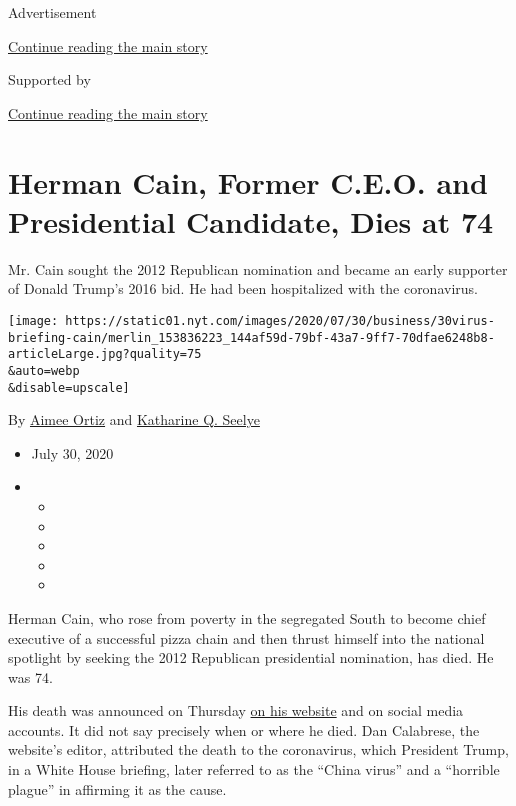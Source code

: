 Advertisement

\protect\hyperlink{after-top}{Continue reading the main story}

Supported by

\protect\hyperlink{after-sponsor}{Continue reading the main story}

\hypertarget{herman-cain-former-ceo-and-presidential-candidate-dies-at-74}{%
\section{Herman Cain, Former C.E.O. and Presidential Candidate, Dies at
74}\label{herman-cain-former-ceo-and-presidential-candidate-dies-at-74}}

Mr. Cain sought the 2012 Republican nomination and became an early
supporter of Donald Trump's 2016 bid. He had been hospitalized with the
coronavirus.

\texttt{[image: https://static01.nyt.com/images/2020/07/30/business/30virus-briefing-cain/merlin\_153836223\_144af59d-79bf-43a7-9ff7-70dfae6248b8-articleLarge.jpg?quality=75\\\&auto=webp\\\&disable=upscale]}

By \href{https://www.nytimes.com/by/aimee-ortiz}{Aimee Ortiz} and
\href{https://www.nytimes.com/by/katharine-q-seelye}{Katharine Q.
Seelye}

\begin{itemize}
\item
  July 30, 2020
\item
  \begin{itemize}
  \item
  \item
  \item
  \item
  \item
  \end{itemize}
\end{itemize}

Herman Cain, who rose from poverty in the segregated South to become
chief executive of a successful pizza chain and then thrust himself into
the national spotlight by seeking the 2012 Republican presidential
nomination, has died. He was 74.

His death was announced on Thursday
\href{https://hermancain.com/heartbroken-world-poorer-herman-cain-gone-lord/?utm_source=twitter\&utm_medium=thenewvoice\&utm_content=2020-07-30}{on
his website} and on social media accounts. It did not say precisely when
or where he died. Dan Calabrese, the website's editor, attributed the
death to the coronavirus, which President Trump, in a White House
briefing, later referred to as the ``China virus'' and a ``horrible
plague'' in affirming it as the cause.

